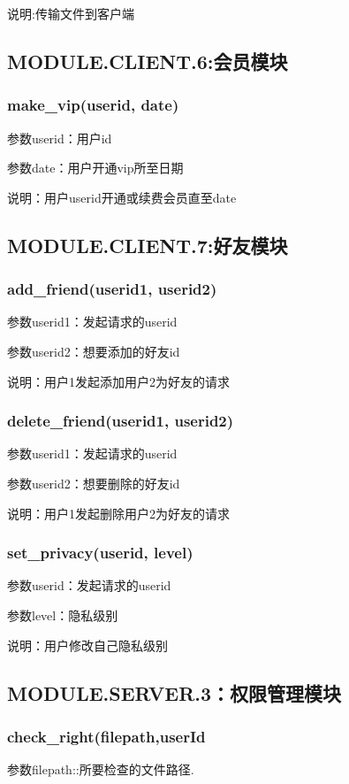 说明:传输文件到客户端
{
\color{red}
\subsection{MODULE.CLIENT.6:会员模块}
\subsubsection{make\_vip(userid, date)}

参数userid：用户id

参数date：用户开通vip所至日期

说明：用户userid开通或续费会员直至date

\subsection{MODULE.CLIENT.7:好友模块}
\subsubsection{add\_friend(userid1, userid2)}

参数userid1：发起请求的userid

参数userid2：想要添加的好友id

说明：用户1发起添加用户2为好友的请求

\subsubsection{delete\_friend(userid1, userid2)}

参数userid1：发起请求的userid

参数userid2：想要删除的好友id

说明：用户1发起删除用户2为好友的请求

\subsubsection{set\_privacy(userid, level)}

参数userid：发起请求的userid

参数level：隐私级别

说明：用户修改自己隐私级别
}
\subsection{MODULE.SERVER.3：权限管理模块}
\subsubsection{check\_right(filepath,userId}
参数filepath::所要检查的文件路径.

